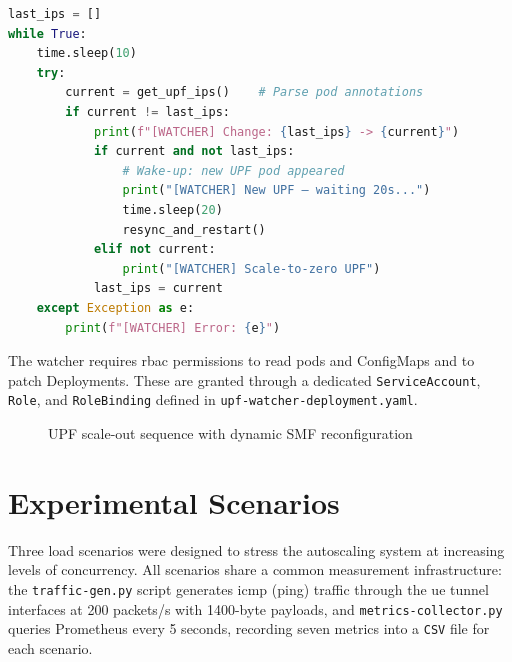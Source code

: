\begin{lstlisting}[language=python, caption={UPF Watcher main monitoring loop (upf-watcher.py)}, label={lst:upf_watcher}]
last_ips = []
while True:
    time.sleep(10)
    try:
        current = get_upf_ips()    # Parse pod annotations
        if current != last_ips:
            print(f"[WATCHER] Change: {last_ips} -> {current}")
            if current and not last_ips:
                # Wake-up: new UPF pod appeared
                print("[WATCHER] New UPF — waiting 20s...")
                time.sleep(20)
                resync_and_restart()
            elif not current:
                print("[WATCHER] Scale-to-zero UPF")
            last_ips = current
    except Exception as e:
        print(f"[WATCHER] Error: {e}")
\end{lstlisting}

The watcher requires \gls{rbac} permissions to read pods and ConfigMaps and to patch Deployments. These are granted through a dedicated \texttt{ServiceAccount}, \texttt{Role}, and \texttt{RoleBinding} defined in \texttt{upf-watcher-deployment.yaml}.

\begin{figure}[H]
  \centering
  \caption{UPF scale-out sequence with dynamic SMF reconfiguration}
  \label{fig:upf_scaleout_timeline}
\end{figure}

\section{Experimental Scenarios}
\label{sec:scenarios}

Three load scenarios were designed to stress the autoscaling system at increasing levels of concurrency. All scenarios share a common measurement infrastructure: the \texttt{traffic-gen.py} script generates \gls{icmp} (ping) traffic through the \gls{ue} tunnel interfaces at 200 packets/s with 1400-byte payloads, and \texttt{metrics-collector.py} queries Prometheus every 5 seconds, recording seven metrics into a \texttt{CSV} file for each scenario.

